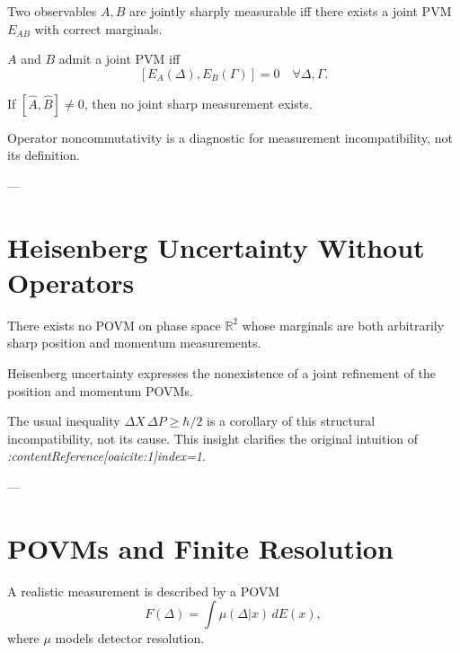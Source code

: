 \documentclass[11pt]{article}
\begin{document}
\begin{definition}
Two observables $A,B$ are jointly sharply measurable iff there exists a
joint PVM $E_{AB}$ with correct marginals.
\end{definition}

\begin{theorem}
$A$ and $B$ admit a joint PVM iff
\[
[E_A(\Delta),E_B(\Gamma)]=0
\quad \forall \Delta,\Gamma.
\]
\end{theorem}

\begin{corollary}
If $[\hat A,\hat B]\neq 0$, then no joint sharp measurement exists.
\end{corollary}

\begin{remark}
Operator noncommutativity is a diagnostic for measurement incompatibility,
not its definition.
\end{remark}

---

\section{Heisenberg Uncertainty Without Operators}

\begin{theorem}
There exists no POVM on phase space $\mathbb R^2$ whose marginals are both
arbitrarily sharp position and momentum measurements.
\end{theorem}

\begin{corollary}
Heisenberg uncertainty expresses the nonexistence of a joint refinement of
the position and momentum POVMs.
\end{corollary}

\begin{remark}
The usual inequality $\Delta X\,\Delta P\ge\hbar/2$ is a corollary of this
structural incompatibility, not its cause.
This insight clarifies the original intuition of
\emph{:contentReference[oaicite:1]{index=1}}.
\end{remark}

---

\section{POVMs and Finite Resolution}

\begin{definition}
A realistic measurement is described by a POVM
\[
F(\Delta)=\int \mu(\Delta|x)\, dE(x),
\]
where $\mu$ models detector resolution.
\end{definition}
\end{document}
